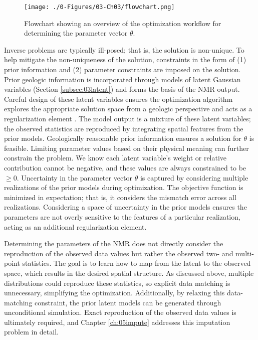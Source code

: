 \begin{figure}[htb!]
    \centering
    \texttt{[image: ./0-Figures/03-Ch03/flowchart.png]}
    \caption{Flowchart showing an overview of the optimization workflow for determining the parameter vector $\theta$.}
    \label{fig:flowchart}
\end{figure}

Inverse problems are typically ill-posed; that is, the solution is non-unique. To help mitigate the non-uniqueness of the solution, constraints in the form of (1) prior information and (2) parameter constraints are imposed on the solution. Prior geologic information is incorporated through models of latent Gaussian variables (Section \ref{subsec:03latent}) and forms the basis of the \gls{NMR} output. Careful design of these latent variables ensures the optimization algorithm explores the appropriate solution space from a geologic perspective and acts as a regularization element \citep{zhou2014inverse}. The model output is a mixture of these latent variables; the observed statistics are reproduced by integrating spatial features from the prior models. Geologically reasonable prior information ensures a solution for $\theta$ is feasible. Limiting parameter values based on their physical meaning can further constrain the problem. We know each latent variable's weight or relative contribution cannot be negative, and these values are always constrained to be $\geq 0$. Uncertainty in the parameter vector $\theta$ is captured by considering multiple realizations of the prior models during optimization. The objective function is minimized in expectation; that is, it considers the mismatch error across all realizations. Considering a space of uncertainty in the prior models ensures the parameters are not overly sensitive to the features of a particular realization, acting as an additional regularization element.

Determining the parameters of the \gls{NMR} does not directly consider the reproduction of the observed data values but rather the observed two- and multi-point statistics. The goal is to learn how to map from the latent to the observed space, which results in the desired spatial structure. As discussed above, multiple distributions could reproduce these statistics, so explicit data matching is unnecessary, simplifying the optimization. Additionally, by relaxing this data-matching constraint, the prior latent models can be generated through unconditional simulation. Exact reproduction of the observed data values is ultimately required, and Chapter \ref{ch:05impute} addresses this imputation problem in detail.


